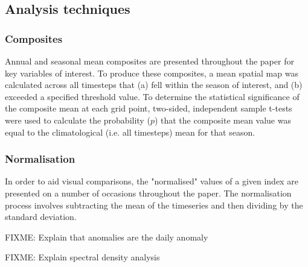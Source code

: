 \subsection{Analysis techniques}

\subsubsection{Composites}
Annual and seasonal mean composites are presented throughout the paper for key variables of interest. To produce these composites, a mean spatial map was calculated across all timesteps that (a) fell within the season of interest, and (b) exceeded a specified threshold value. To determine the statistical significance of the composite mean at each grid point, two-sided, independent sample t-tests were used to calculate the probability ($p$) that the composite mean value was equal to the climatological (i.e. all timesteps) mean for that season.    

\subsubsection{Normalisation}
In order to aid visual comparisons, the "normalised" values of a given index are presented on a number of occasions throughout the paper. The normalisation process involves subtracting the mean of the timeseries and then dividing by the standard deviation. 

FIXME: Explain that anomalies are the daily anomaly

FIXME: Explain spectral density analysis